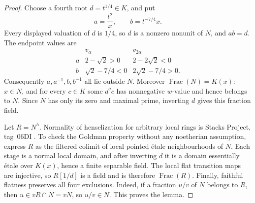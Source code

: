 \begin{proof}
Choose a fourth root $d=t^{1/4}\in K$, and put
\[
 a=\frac{t^2}{x},\qquad b=t^{-7/4}x.
\]
Every displayed valuation of $d$ is $1/4$, so $d$ is a nonzero
nonunit of $N$, and $ab=d$. The endpoint values are
\[
\begin{array}{c|cc}
 &v_\alpha&v_{2\alpha}\\ \hline
 a&2-\sqrt2>0&2-2\sqrt2<0\\
 b&\sqrt2-7/4<0&2\sqrt2-7/4>0.
\end{array}
\]
Consequently $a,a^{-1},b,b^{-1}$ all lie outside $N$.
Moreover $\operatorname{Frac}(N)=K(x)$: $x\in N$, and for every
$c\in K$ some $d^q c$ has nonnegative $w$-value and hence belongs
to $N$. Since $N$ has only its zero and maximal prime, inverting
$d$ gives this fraction field.

Let $R=N^h$. Normality of henselization for arbitrary local rings
is Stacks Project, tag~06DI \cite{BStacks}. To check the Goldman property without
any noetherian assumption, express $R$ as the filtered colimit of
local pointed \'etale neighbourhoods of $N$. Each stage is a normal
local domain, and after inverting $d$ it is a domain essentially
\'etale over $K(x)$, hence a finite separable field. The local flat
transition maps are injective, so $R[1/d]$ is a field and is therefore
$\operatorname{Frac}(R)$. Finally, faithful flatness preserves all
four exclusions. Indeed, if a fraction $u/v$ of $N$ belongs to $R$,
then $u\in vR\cap N=vN$, so $u/v\in N$. This proves the lemma.
\end{proof}

